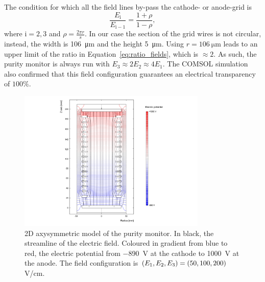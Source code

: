 \documentclass[a4paper,11pt]{article}
\begin{document}
The condition for which all the field lines by-pass the cathode- or anode-grid is
\begin{equation}
    \frac{E_\mathrm{i}}{E_{\mathrm{i}-1}} = \frac{1+\rho}{1-\rho},
    \label{eq:ratio_fields}
\end{equation}
\noindent where $\mathrm{i} = 2,3$ and $\rho = \frac{2\pi r}{s}$. 
In our case the section of the grid wires is not circular, instead, the width is \SI{106}{\micro\metre} and the height \SI{5}{\micro\metre}. Using $r=\SI{106}{\micro\metre}$ leads to an upper limit of the ratio in Equation~\ref{eq:ratio_fields}, which is $\approx 2$. As such, the purity monitor is always run with $E_3\approx 2 E_2 \approx 4 E_1$. The COMSOL simulation also confirmed that this field configuration guarantees an electrical transparency of $100\%$. 

\begin{figure}
	\begin{center}
	\includegraphics[width=0.8\textwidth, trim={0 0cm 0cm 0cm}, clip=true]{figures/COMSOLsim.png}	
	\caption{2D axysymmetric model of the purity monitor. In black, the streamline of the electric field. Coloured in gradient from blue to red, the electric potential from \SI{-890}{\volt} at the cathode to \SI{1000}{\volt} at the anode. The field configuration is $\protect (E_1, E_2, E_3) = (50, 100, 200)$\;V/cm.}
	\label{fig:Comsol}
	\end{center}
\end{figure}
\end{document}
